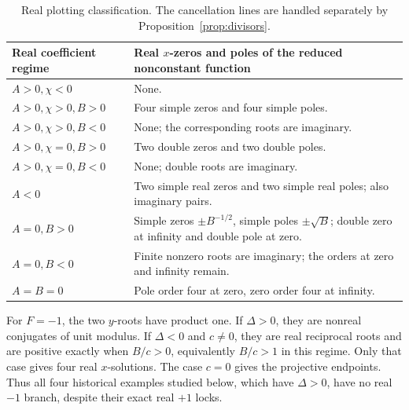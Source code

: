 \begin{table}[htbp]\centering\small
\begin{tabularx}{\linewidth}{L{49mm}Y}\toprule
Real coefficient regime & Real \(x\)-zeros and poles of the reduced nonconstant function\\\midrule
\(A>0,\chi<0\) & None.\\
\(A>0,\chi>0,B>0\) & Four simple zeros and four simple poles.\\
\(A>0,\chi>0,B<0\) & None; the corresponding roots are imaginary.\\
\(A>0,\chi=0,B>0\) & Two double zeros and two double poles.\\
\(A>0,\chi=0,B<0\) & None; double roots are imaginary.\\
\(A<0\) & Two simple real zeros and two simple real poles; also imaginary pairs.\\
\(A=0,B>0\) & Simple zeros \(\pm B^{-1/2}\), simple poles \(\pm\sqrt B\); double zero at infinity and double pole at zero.\\
\(A=0,B<0\) & Finite nonzero roots are imaginary; the orders at zero and infinity remain.\\
\(A=B=0\) & Pole order four at zero, zero order four at infinity.\\\bottomrule
\end{tabularx}\caption{Real plotting classification. The cancellation lines are handled separately by Proposition~\ref{prop:divisors}.}\label{tab:realroots}
\end{table}

For \(F=-1\), the two \(y\)-roots have product one. If \(\Delta>0\), they are nonreal conjugates of unit modulus. If \(\Delta<0\) and \(c\ne0\), they are real reciprocal roots and are positive exactly when \(B/c>0\), equivalently \(B/c>1\) in this regime. Only that case gives four real \(x\)-solutions. The case \(c=0\) gives the projective endpoints. Thus all four historical examples studied below, which have \(\Delta>0\), have no real \(-1\) branch, despite their exact real \(+1\) locks.
